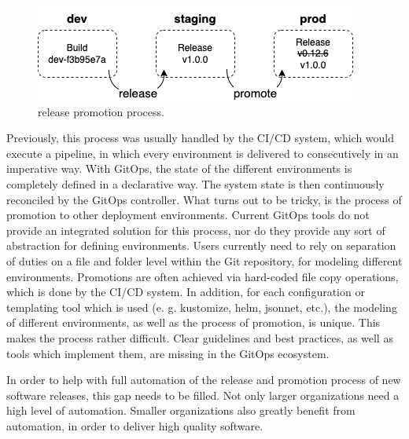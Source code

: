 \begin{figure}[h]
	\centering
	\includegraphics[width=.55\linewidth]{figures/release-promotion.drawio.png}
	\caption{release promotion process.
	}
	\label{fig:releasePromotionProcess}	
\end{figure}

\noindent
Previously, this process was usually handled by the CI/CD system,
which would execute a pipeline, in which every environment
is delivered to consecutively
in an imperative way.
With GitOps, the state of the different environments
is completely defined
in a declarative way.
The system state is then continuously reconciled
by the GitOps controller.
What turns out to be tricky,
is the process of promotion to other deployment environments.
Current GitOps tools do not provide an integrated solution for this process,
nor do they provide any sort of abstraction for defining environments.
Users currently need to rely on separation of duties
on a file and folder level within the Git repository,
for modeling different environments.
Promotions are often achieved via hard-coded file copy operations,
which is done by the CI/CD system.
In addition, for each configuration or templating tool which is used
(e. g. kustomize, helm, jsonnet, etc.),
the modeling of different environments, as well as the
process of promotion, is unique.
This makes the process rather difficult.
Clear guidelines and best practices,
as well as tools which implement them,
are missing in the GitOps ecosystem.
\bigskip

\noindent
In order to help with full automation of the 
release and promotion process of new software releases,
this gap needs to be filled.
Not only larger organizations need a high level of automation.
Smaller organizations also
greatly benefit from automation, in order
to deliver high quality software.
\bigskip











